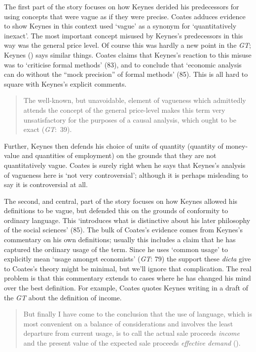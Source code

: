 \documentclass[
  11pt,
  letterpaper,
  DIV=11,
  numbers=noendperiod,
  twoside]{scrartcl}
\begin{document}
The first part of the story focuses on how Keynes derided his
predecessors for using concepts that were vague as if they were precise.
Coates adduces evidence to show Keynes in this context used `vague' as a
synonym for `quantitatively inexact'. The most important concept misused
by Keynes's predecessors in this way was the general price level. Of
course this was hardly a new point in the \emph{GT}; Keynes
() says similar things. Coates claims
that Keynes's reaction to this misuse was to `criticise formal methods'
(83), and to conclude that `economic analysis can do without the ``mock
precision'' of formal methods' (85). This is all hard to square with
Keynes's explicit comments.

\begin{quote}
The well-known, but unavoidable, element of vagueness which admittedly
attends the concept of the general price-level makes this term very
unsatisfactory for the purposes of a causal analysis, which ought to be
exact (\emph{GT}:~39).
\end{quote}

Further, Keynes then defends his choice of units of quantity (quantity
of money-value and quantities of employment) on the grounds that they
are not quantitatively vague. Coates is surely right when he says that
Keynes's analysis of vagueness here is `not very controversial';
although it is perhaps misleading to say it is controversial at all.

The second, and central, part of the story focuses on how Keynes allowed
his definitions to be vague, but defended this on the grounds of
conformity to ordinary language. This `introduces what is distinctive
about his later philosophy of the social sciences' (85). The bulk of
Coates's evidence comes from Keynes's commentary on his own definitions;
usually this includes a claim that he has captured the ordinary usage of
the term. Since he uses `common usage' to explicitly mean `usage amongst
economists' (\emph{GT}: 79) the support these \emph{dicta} give to
Coates's theory might be minimal, but we'll ignore that complication.
The real problem is that this commentary extends to cases where he has
changed his mind over the best definition. For example, Coates quotes
Keynes writing in a draft of the \emph{GT} about the definition of
income.

\begin{quote}
But finally I have come to the conclusion that the use of language,
which is most convenient on a balance of considerations and involves the
least departure from current usage, is to call the actual sale proceeds
\emph{income} and the present value of the expected sale proceeds
\emph{effective demand} ().
\end{quote}
\end{document}
